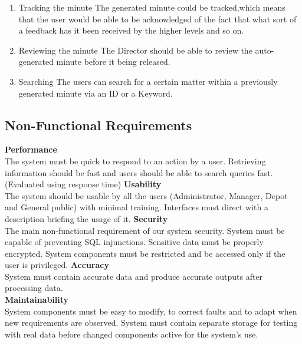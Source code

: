 \documentclass[a4paper,beamer]{article}
\begin{document}
\begin{enumerate}
		\item Tracking the minute \newline
		The generated minute could be tracked,which means that the user would be able to be acknowledged of the fact that what sort of a feedback has it been received by the higher levels and so on.
		
		\item Reviewing the minute \newline
		The Director should be able to review the auto-generated minute before it being released.
		
		\item Searching \newline
		The users can search for a certain matter within a previously generated minute via an ID or a Keyword.
		
	\end{enumerate}
	
	
	
	
	\subsection{Non-Functional Requirements}
	\textbf{Performance}\\
	The system must be quick to respond to an action by a user. Retrieving information should be fast and users should be able to search queries fast. (Evaluated using response time) \newline
	\newline
	\textbf{Usability}\\
	The system should be usable by all the users (Administrator, Manager, Depot and General public) with minimal training. Interfaces must direct with a description briefing the usage of it.\newline
	\newline
	\textbf{Security}\\
	The main non-functional requirement of our system security. System must be capable of preventing SQL injunctions. Sensitive data must be properly encrypted. System components must be restricted and be accessed only if the user is privileged.\newline
	\newline
	\textbf{Accuracy}\\
	System must contain accurate data and produce accurate outputs after processing data.\\
	\newline
	\textbf{Maintainability}\\
	System components must be easy to modify, to correct faults and to adapt when new requirements are observed. System must contain separate storage for testing with real data before changed components active for the system’s use.\newline
	
\end{document}

